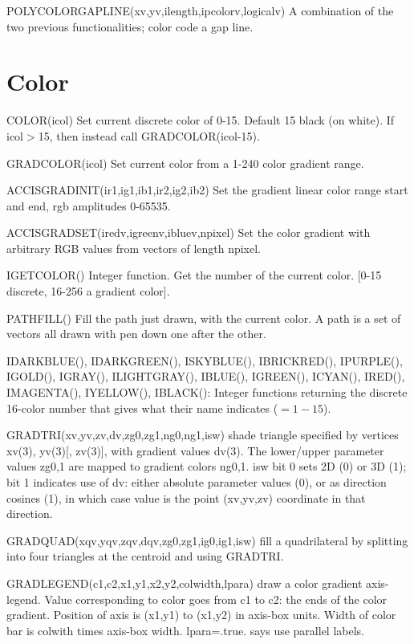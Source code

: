 \documentclass[12pt]{article}
\newif \iftth
\begin{document}
POLYCOLORGAPLINE(xv,yv,ilength,ipcolorv,logicalv) A combination of the
two previous functionalities; color code a gap line.

\section{Color}

\iftth \special{html:<a href="filltest.f"><img align="right" src="filltest.png"></a>}\fi
COLOR(icol) Set current discrete color of 0-15. Default 15 black (on
white). If icol$>$15, then instead call GRADCOLOR(icol-15).

GRADCOLOR(icol) Set current color from a 1-240 color gradient range.

ACCISGRADINIT(ir1,ig1,ib1,ir2,ig2,ib2) Set the gradient linear color
range start and end, rgb amplitudes 0-65535.

ACCISGRADSET(iredv,igreenv,ibluev,npixel) Set the color gradient with
arbitrary RGB values from vectors of length npixel.

IGETCOLOR() Integer function.  Get the number of the current
color. [0-15 discrete, 16-256 a gradient color].

PATHFILL() Fill the path just drawn, with the current color. A path is
a set of vectors all drawn with pen down one after the other.

IDARKBLUE(), IDARKGREEN(),  ISKYBLUE(),  IBRICKRED(),  IPURPLE(),
IGOLD(),  IGRAY(),  ILIGHTGRAY(),  IBLUE(),  IGREEN(),  ICYAN(),
IRED(),  IMAGENTA(),  IYELLOW(),  IBLACK(): Integer functions returning
the discrete 16-color number that gives what their name indicates ($=1-15$).

GRADTRI(xv,yv,zv,dv,zg0,zg1,ng0,ng1,isw) shade triangle specified by
vertices xv(3), yv(3)[, zv(3)], with gradient values dv(3). The
lower/upper parameter values zg0,1 are mapped to gradient colors
ng0,1. isw bit 0 sets 2D (0) or 3D (1); bit 1 indicates use of dv:
either absolute parameter values (0), or as direction cosines (1), in
which case value is the point (xv,yv,zv) coordinate in that direction.

GRADQUAD(xqv,yqv,zqv,dqv,zg0,zg1,ig0,ig1,isw) fill a quadrilateral 
by splitting into four triangles at the centroid and using GRADTRI. 

GRADLEGEND(c1,c2,x1,y1,x2,y2,colwidth,lpara) draw a color gradient
axis-legend. Value corresponding to color goes from c1 to c2: the ends of
the color gradient. Position of axis is (x1,y1) to (x1,y2) in axis-box
units. Width of color bar is colwith times axis-box
width. lpara=.true. says use parallel labels.
\end{document}
